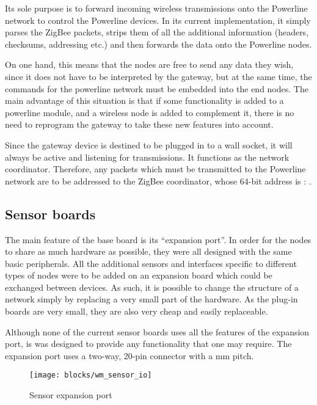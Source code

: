 
Its sole purpose is to forward incoming wireless transmissions onto the
Powerline network to control the Powerline devices. In its current
implementation, it simply parses the ZigBee packets, strips them of all the
additional information (headers, checksums, addressing etc.) and then forwards
the data onto the Powerline nodes.

On one hand, this means that the nodes are free to send any data they wish,
since it does not have to be interpreted by the gateway, but at the same time,
the commands for the powerline network must be embedded into the end nodes. The
main advantage of this situation is that if some functionality is added to a
powerline module, and a wireless node is added to complement it, there is no
need to reprogram the gateway to take these new features into account.

Since the gateway device is destined to be plugged in to a wall socket, it will
always be active and listening for transmissions. It functions as the network
coordinator. Therefore, any packets which must be transmitted to the Powerline
network are to be addressed to the ZigBee coordinator, whose 64-bit address is :
.

\subsection{Sensor boards}

The main feature of the base board is its ``expansion port''. In order for the
nodes to share as much hardware as possible, they were all designed with the
same basic peripherals. All the additional sensors and interfaces specific to
different types of nodes were to be added on an expansion board which could be
exchanged between devices. As such, it is possible to change the structure of a
network simply by replacing a very small part of the hardware. As the plug-in
boards are very small, they are also very cheap and easily replaceable.

Although none of the current sensor boards uses all the features of the
expansion port, is was designed to provide any functionality that one may
require. The expansion port uses a two-way, 20-pin connector with a \unit[2]{mm}
pitch.

\begin{figure}[!h]
  \begin{center}
    \texttt{[image: blocks/wm\_sensor\_io]}
  \end{center}
  \caption{Sensor expansion port}
  \label{fig:sensor-io}
\end{figure}

